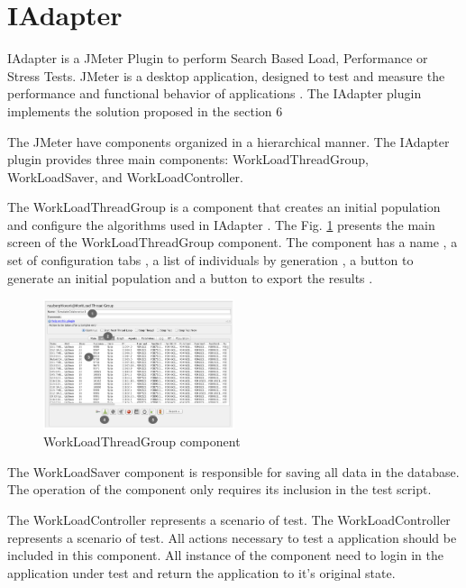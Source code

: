 \section{IAdapter}

IAdapter is a JMeter Plugin to perform Search Based Load, Performance or Stress Tests. JMeter is a desktop application, designed to test and measure the performance and functional behavior of applications \cite{Nevedrov2007}. The IAdapter plugin implements the solution proposed in the section 6

The JMeter have components organized  in a hierarchical manner. The IAdapter plugin provides three main components: WorkLoadThreadGroup, WorkLoadSaver, and WorkLoadController.
 
The WorkLoadThreadGroup is a component that creates an initial population and configure the algorithms used in IAdapter . The Fig. \ref{fig:tela1iadapter} presents the main screen of the WorkLoadThreadGroup component. The component has a name , a set of configuration tabs , a list of individuals by generation , a button to generate an initial population  and a button to export the results .

\begin{figure}[h]
\includegraphics[width=0.5\textwidth]{./images/tela1iadapter.png}
\caption{WorkLoadThreadGroup component}
\label{fig:tela1iadapter}
\end{figure}

The WorkLoadSaver component is responsible for saving all data in the database. The operation of the component only requires its inclusion in the test script.

The WorkLoadController represents a scenario of test. The WorkLoadController represents a scenario of test. All actions necessary to test a application should be included in this component. All instance of the component need to login in the application under test and return the application to it's original state.

